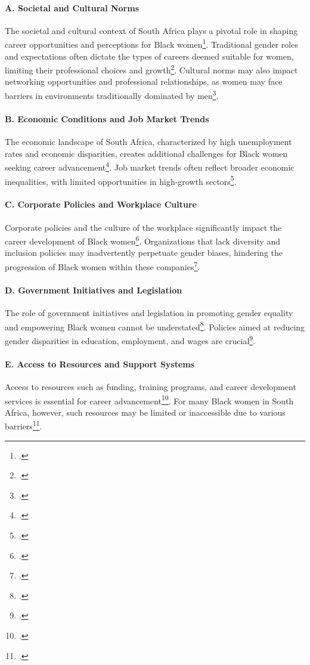 \documentclass{article}
\begin{document}
\paragraph{A. Societal and Cultural Norms}
The societal and cultural context of South Africa plays a pivotal role in shaping career opportunities and perceptions for Black women\footcite{cohen2020material}. Traditional gender roles and expectations often dictate the types of careers deemed suitable for women, limiting their professional choices and growth\footcite{micklesfield2013socio}. Cultural norms may also impact networking opportunities and professional relationships, as women may face barriers in environments traditionally dominated by men\footcite{chinyamurindi2016narrative}.

\paragraph{B. Economic Conditions and Job Market Trends}
The economic landscape of South Africa, characterized by high unemployment rates and economic disparities, creates additional challenges for Black women seeking career advancement\footcite{fenyes2000casualization}. Job market trends often reflect broader economic inequalities, with limited opportunities in high-growth sectors\footcite{lumby2011women}.

\paragraph{C. Corporate Policies and Workplace Culture}
Corporate policies and the culture of the workplace significantly impact the career development of Black women\footcite{watson1995career}. Organizations that lack diversity and inclusion policies may inadvertently perpetuate gender biases, hindering the progression of Black women within these companies\footcite{matotoka2018transformative}.

\paragraph{D. Government Initiatives and Legislation}
The role of government initiatives and legislation in promoting gender equality and empowering Black women cannot be understated\footcite{doubell2014perceptions}. Policies aimed at reducing gender disparities in education, employment, and wages are crucial\footcite{monnapula-mapesela2017developing}.

\paragraph{E. Access to Resources and Support Systems}
Access to resources such as funding, training programs, and career development services is essential for career advancement\footcite{gradin2018occupational}. For many Black women in South Africa, however, such resources may be limited or inaccessible due to various barriers\footcite{geldenhuys2007career}.
\end{document}
